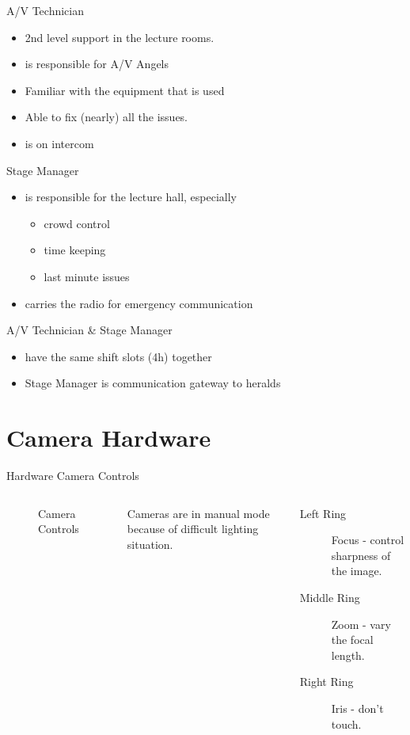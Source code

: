 \documentclass[aspectratio=169]{beamer}
\begin{document}
\begin{frame}{A/V Technician}
	\begin{itemize}
		\item 2nd level support in the lecture rooms. 
		\item is responsible for A/V Angels
		\item Familiar with the equipment that is used 
		\item Able to fix (nearly) all the issues. 
		\item is on intercom
	\end{itemize}
\end{frame}


\begin{frame}{Stage Manager}
\begin{itemize}
	\item is responsible for the lecture hall, especially
	\begin{itemize}
		\item crowd control
		\item time keeping
		\item last minute issues 
	\end{itemize}
	\item carries the radio for emergency communication
\end{itemize}
\end{frame}

\begin{frame}{A/V Technician \& Stage Manager}
\begin{itemize}
	\item have the same shift slots (4h) together
	\item Stage Manager is communication gateway to heralds
\end{itemize}
\end{frame}


\section{Camera Hardware}
\begin{frame}{Hardware Camera Controls}
	\begin{columns}[T,onlytextwidth]
		\begin{figure} 
			\centering
			\caption{Camera Controls}
		\end{figure}
		Cameras are in manual mode because of difficult lighting situation.
		\begin{description}
			\item[Left Ring] Focus - control sharpness of the image.
			\item[Middle Ring] Zoom - vary the focal length.
			\item[Right Ring] Iris - don't touch.
		\end{description}
	\end{columns}
\end{frame}
\end{document}
